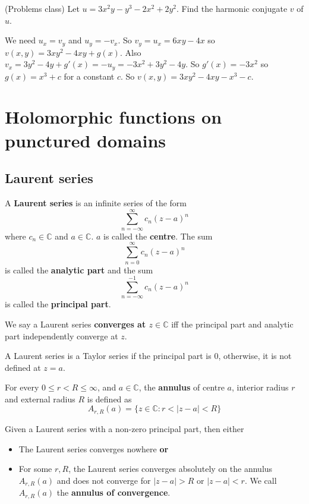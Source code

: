 \begin{example}
	(Problems class) Let $u = 3x^2 y - y^3 - 2x^2 + 2y^2$. Find the harmonic conjugate $v$ of $u$.

	We need $u_x = v_y$ and $u_y = -v_x$. So $v_y = u_x = 6xy - 4x$ so $v(x, y) = 3xy^2 - 4xy + g(x)$. Also $v_x = 3y^2 - 4y + g'(x) = -u_y = -3x^2 + 3y^2 - 4y$. So $g'(x) = -3x^2$ so $g(x) = x^3 + c$ for a constant $c$. So $v(x, y) = 3xy^2 - 4xy - x^3 - c$.
\end{example}

\section{Holomorphic functions on punctured domains}

\subsection{Laurent series}

\begin{definition}
	A \textbf{Laurent series} is an infinite series of the form
	\[
		\sum_{n = -\infty}^{\infty} c_n {(z - a)}^n
	\]
	where $c_n \in \mathbb{C}$ and $a \in \mathbb{C}$. $a$ is called the \textbf{centre}. The sum
	\[
		\sum_{n = 0}^{\infty} c_n {(z - a)}^n
	\]
	is called the \textbf{analytic part} and the sum
	\[
		\sum_{n = -\infty}^{-1} c_n {(z - a)}^n
	\]
	is called the \textbf{principal part}.
\end{definition}

\begin{definition}
	We say a Laurent series \textbf{converges at $z \in \mathbb{C}$} iff the principal part and analytic part independently converge at $z$.
\end{definition}

\begin{remark}
	A Laurent series is a Taylor series if the principal part is $0$, otherwise, it is not defined at $z = a$.
\end{remark}

\begin{definition}
	For every $0 \le r < R \le \infty$, and $a \in \mathbb{C}$, the \textbf{annulus} of centre $a$, interior radius $r$ and external radius $R$ is defined as
	\[
		A_{r, R}(a) = \{ z \in \mathbb{C}: r < |z - a| < R \}
	\]
\end{definition}

\begin{proposition}
	Given a Laurent series with a non-zero principal part, then either
	\begin{itemize}
		\item The Laurent series converges nowhere \textbf{or}
		\item For some $r, R$, the Laurent series converges absolutely on the annulus $A_{r, R}(a)$ and does not converge for $|z - a| > R$ or $|z - a| < r$. We call $A_{r, R}(a)$ the \textbf{annulus of convergence}.
	\end{itemize}
\end{proposition}

